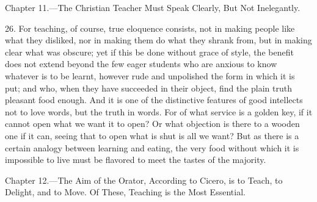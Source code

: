 
Chapter 11.—The Christian Teacher Must Speak Clearly, But Not Inelegantly.

26. For teaching, of course, true eloquence consists, not in making people like what they disliked, nor in making them do what they shrank from, but in making clear what was obscure; yet if this be done without grace of style, the benefit does not extend beyond the few eager students who are anxious to know whatever is to be learnt, however rude and unpolished the form in which it is put; and who, when they have succeeded in their object, find the plain truth pleasant food enough. And it is one of the distinctive features of good intellects not to love words, but the truth in words. For of what service is a golden key, if it cannot open what we want it to open? Or what objection is there to a wooden one if it can, seeing that to open what is shut is all we want? But as there is a certain analogy between learning and eating, the very food without which it is impossible to live must be flavored to meet the tastes of the majority.


Chapter 12.—The Aim of the Orator, According to Cicero, is to Teach, to Delight, and to Move. Of These, Teaching is the Most Essential.

